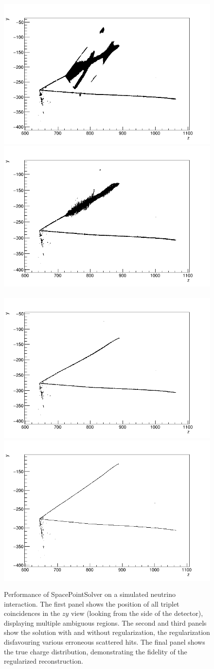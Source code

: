 \begin{figure}
\includegraphics[width=.5\linewidth]{graphics/evd_zy_pre_2302}
\includegraphics[width=.5\linewidth]{graphics/evd_zy_noreg_2302}\\
\\
\includegraphics[width=.5\linewidth]{graphics/evd_zy_2302}
\includegraphics[width=.5\linewidth]{graphics/evd_zy_true_2302}
\\

\caption[Event displays of SpacePointSolver performance]{Performance of SpacePointSolver on a simulated  neutrino interaction. The first panel shows the position of all triplet coincidences in the $zy$ view (looking from the side of the detector), displaying multiple ambiguous regions. The second and third panels show the solution with and without regularization, the regularization disfavouring various erroneous scattered hits. The final panel shows the true charge distribution, demonstrating %
the fidelity of the regularized reconstruction.}

\label{fig:spacepoint}
\end{figure}

